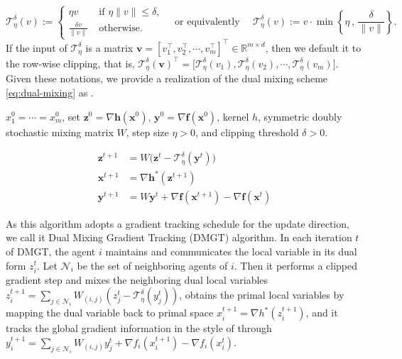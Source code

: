 \documentclass{article}
\theoremstyle{plain}
\theoremstyle{definition}
\theoremstyle{remark}
\newcommand{\clip}{\mathcal{T}^\delta_\eta}
\newcommand{\R}{\mathbb{R}}
\newcommand{\bv}{\mathbf{v}}
\newcommand{\bh}{\mathbf{h}}
\newcommand{\bx}{\mathbf{x}}
\newcommand{\by}{\mathbf{y}}
\newcommand{\bz}{\mathbf{z}}
\newcommand{\bff}{\mathbf{f}}
\begin{document}
\begin{equation}\label{eq:clipping operator}
   \clip(v):=\begin{cases}
       \eta v & \; \text{if $\eta\|v\|\leq \delta $},\\[2mm]
        \frac{\delta v}{\|v\|}&\;\text{otherwise}.
   \end{cases} \quad \text{or equivalently } \quad \clip(v):= v \cdot \min\left\{\eta\,,\,\frac{\delta}{\|v\|}\right\}.
\end{equation}
If the input of $\clip$ is a matrix $\bv=[v_1^\top,v_2^\top,\cdots,v_m^\top]^\top \in\R^{m\times d}$, then we default it to the row-wise clipping, that is, $\clip(\bv)^\top = \big[\clip(v_1), \clip(v_2),\cdots, \clip(v_m)\big]$. 
Given these notations, we provide a realization of the dual mixing scheme \eqref{eq:dual-mixing} as . 

\begin{algorithm}[H]
   \caption{Dual Mixing Gradient Tracking ({\sf DMGT})}
   \label{alg:DMGT}
\begin{algorithmic}
    $x_1^0=\cdots=x_m^0$, set $\bz^0=\nabla \bh(\bx^0)$, $\by^0=\nabla \bff(\bx^0)$, kernel $h$, symmetric doubly stochastic mixing matrix $W$, step size $\eta>0$, and clipping threshold $\delta>0$.
   \Repeat\vspace{-4mm}
   \State\begin{minipage}{.95\linewidth}
   \begin{align}
     \label{eq:update z}  \bz^{t+1} &= W \big(\bz^t - \clip(\by^t)\big)\\[1mm]
     \label{eq:update x}\bx^{t+1}&=\nabla \bh^*(\bz^{t+1})\\[1mm]
     \label{eq:update y}  \by^{t+1} &= W \by^t + \nabla \bff(\bx^{t+1}) - \nabla \bff(\bx^{t})
   \end{align}
   \end{minipage}
   \vspace{1mm}
\end{algorithmic}
\end{algorithm}
As this algorithm adopts a gradient tracking schedule for the update direction, we call it Dual Mixing Gradient Tracking ({\sf DMGT}) algorithm. In each iteration $t$ of {\sf DMGT}, the agent $i$ maintains and communicates the local variable in its dual form $z_i^t$. Let $\mathcal{N}_i$ be the set of neighboring agents of $i$. Then it performs a clipped gradient step and mixes the neighboring dual local variables  $z_{i}^{t+1} = \sum_{j\in\mathcal{N}_i}W_{(i,j)}(z_{j}^t-\clip(y_j^t))$, obtains the primal local variables by mapping the dual variable  back to primal space $x_{i}^{t+1} = \nabla h^*(z_i^{t+1})$, and it tracks the global gradient information in the style of \cite{Qu2018Harnessing} through $y_{i}^{t+1} = \sum_{j\in\mathcal{N}_i} W_{(i,j)}y_{j}^t + \nabla f_i(x_i^{t+1})-\nabla f_i(x_i^{t})$. 
\end{document}
